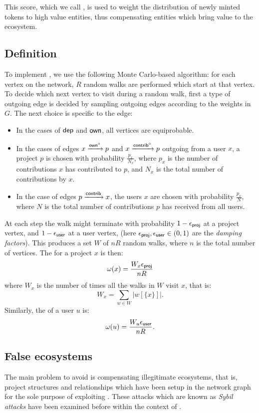 This score, which we call \osrank{}, is used to weight the
distribution of newly minted tokens to high value entities, thus
compensating entities which bring value to the ecosystem.

\subsection{Definition}

To implement \osrank{}, we use the following Monte Carlo-based algorithm: for
each vertex on the network, $R$ random walks are performed which start at that
vertex. To decide which next vertex to visit during a random walk, first a type
of outgoing edge is decided by sampling outgoing edges according to the weights
in $G$. The next choice is specific to the edge:

\begin{itemize}
\item In the cases of $\mathsf{dep}$ and $\mathsf{own}$, all vertices are equiprobable.
\item In the cases of edges $x \xrightarrow[]{\mathsf{own}^\circ} p$ and
  $x \xrightarrow[]{\mathsf{contrib}^\circ} p$ outgoing from a user $x$, a project $p$ is
  chosen with probability $\frac{p_x}{N_x}$, where $p_x$ is the number of
  contributions $x$ has contributed to $p$, and $N_x$ is the total number of
  contributions by $x$.
\item In the case of edges $p \xrightarrow[]{\mathsf{contrib}} x$, the users $x$ are
  chosen with probability $\frac{p_x}{N}$, where $N$ is the total number of
  contributions $p$ has received from all users.
\end{itemize}

At each step the walk might terminate with probability $1 - \epsilon_{\mathsf{proj}}$ at a
project vertex, and $1 - \epsilon_{\mathsf{user}}$ at a user vertex, (here
$\epsilon_{\mathsf{proj}}, \epsilon_{\mathsf{user}} \in (0,1)$ are the \emph{damping factors}). This
produces a set $W$ of $nR$ random walks, where $n$ is the total number of
vertices. The \osrank{} for a project $x$ is then:
\[
  \omega(x) = \frac{W_x \epsilon_{\mathsf{proj}}}{n R}
\]
where $W_x$ is the number of times all the walks in $W$ visit $x$, that is:
\[
W_x = \sum_{w \in W} |w[\{x\}]|.
\]
Similarly, the \osrank{} of a user $u$ is:
\[
  \omega(u) = \frac{W_u \epsilon_{\mathsf{user}}}{n R}.
\]

\subsection{False ecosystems}

The main problem to avoid is compensating illegitimate ecosystems, that is,
project structures and relationships which have been setup in the
network graph for the sole purpose of exploiting \osrank{}.
These attacks which are known as \emph{Sybil attacks} have been examined
before \cite{pagerank-sybil} within the context of \pagerank{}.

